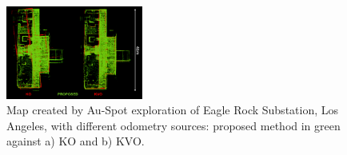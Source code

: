 \documentclass[letterpaper, 10pt, conference]{ieeeconf}      %
\newcommand{\inst}[1]{{\color{orange} #1 }} %
\newcommand{\rev}[1]{{\color{blue}#1}} %
\begin{document}







\begin{figure}[t!]
  \centering
  \includegraphics[width=0.4\textwidth]{spot_iros/graphics/spot_eagle_rock_shrinked_black_1.png}
  \caption{\rev{Map created by Au-Spot exploration of Eagle Rock Substation, Los Angeles, with different odometry sources: proposed method in green against a) KO and b) KVO.}}
  \label{spot_eagle_rock}
\end{figure}
\end{document}
